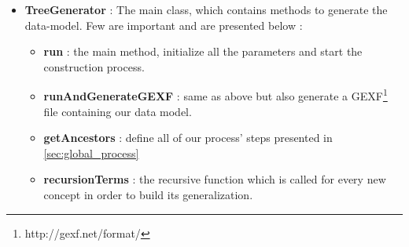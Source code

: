 \begin{itemize}
\begin{itemize}
	\end{itemize}
	\item \textbf{TreeGenerator} : The main class, which contains methods to generate the data-model. Few are important and are presented below :
	\begin{itemize}
		\item \textbf{run} : the main method, initialize all the parameters and start the construction process.
		\item \textbf{runAndGenerateGEXF} : same as above but also generate a GEXF\footnote{http://gexf.net/format/} file containing our data model.
		\item \textbf{getAncestors} : define all of our process' steps presented in \ref{sec:global_process}
		\item \textbf{recursionTerms} : the recursive function which is called for every new concept in order to build its generalization.
	\end{itemize}
\end{itemize}

